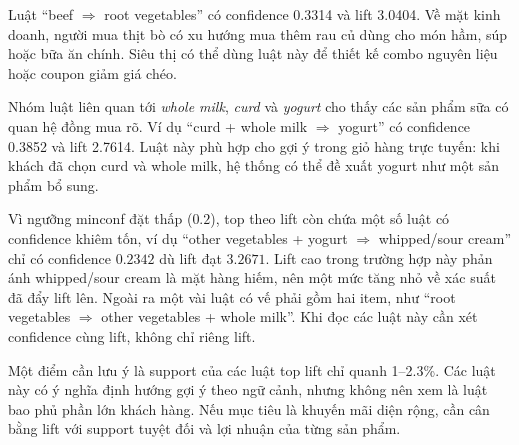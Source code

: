 Luật ``beef $\Rightarrow$ root vegetables'' có confidence 0.3314 và lift 3.0404. Về mặt kinh doanh, người mua thịt bò có xu hướng mua thêm rau củ dùng cho món hầm, súp hoặc bữa ăn chính. Siêu thị có thể dùng luật này để thiết kế combo nguyên liệu hoặc coupon giảm giá chéo.

Nhóm luật liên quan tới \textit{whole milk}, \textit{curd} và \textit{yogurt} cho thấy các sản phẩm sữa có quan hệ đồng mua rõ. Ví dụ ``curd + whole milk $\Rightarrow$ yogurt'' có confidence 0.3852 và lift 2.7614. Luật này phù hợp cho gợi ý trong giỏ hàng trực tuyến: khi khách đã chọn curd và whole milk, hệ thống có thể đề xuất yogurt như một sản phẩm bổ sung.

Vì ngưỡng minconf đặt thấp ($0.2$), top theo lift còn chứa một số luật có confidence khiêm tốn, ví dụ ``other vegetables + yogurt $\Rightarrow$ whipped/sour cream'' chỉ có confidence $0.2342$ dù lift đạt $3.2671$. Lift cao trong trường hợp này phản ánh whipped/sour cream là mặt hàng hiếm, nên một mức tăng nhỏ về xác suất đã đẩy lift lên. Ngoài ra một vài luật có vế phải gồm hai item, như ``root vegetables $\Rightarrow$ other vegetables + whole milk''. Khi đọc các luật này cần xét confidence cùng lift, không chỉ riêng lift.

Một điểm cần lưu ý là support của các luật top lift chỉ quanh 1--2.3\%. Các luật này có ý nghĩa định hướng gợi ý theo ngữ cảnh, nhưng không nên xem là luật bao phủ phần lớn khách hàng. Nếu mục tiêu là khuyến mãi diện rộng, cần cân bằng lift với support tuyệt đối và lợi nhuận của từng sản phẩm.
